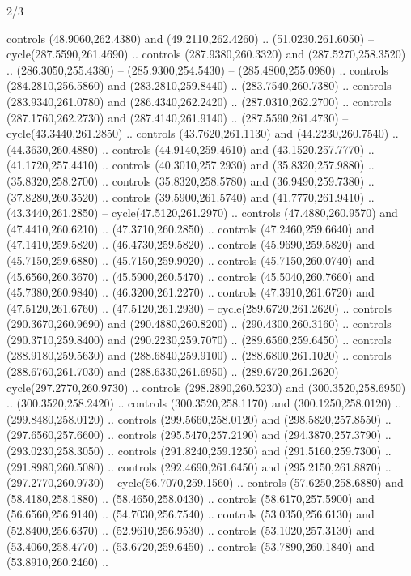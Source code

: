 \begin{flagdescription}{2/3}
\begin{scope}[xshift=0.5\flaglength,yshift=0.5\flagwidth,scale=\stretchfactor]
\begin{scope}[scale=0.001645\flagwidth,yshift=65mm,xshift=-63mm]
\begin{scope}[y=0.80pt, x=0.80pt, yscale=-1,]
\begin{scope}[cm={{1.33333,0.0,0.0,1.33333,(0.0,1e-05)}}]
  controls (48.9060,262.4380) and (49.2110,262.4260) .. (51.0230,261.6050) --
  cycle(287.5590,261.4690) .. controls (287.9380,260.3320) and
  (287.5270,258.3520) .. (286.3050,255.4380) -- (285.9300,254.5430) --
  (285.4800,255.0980) .. controls (284.2810,256.5860) and (283.2810,259.8440) ..
  (283.7540,260.7380) .. controls (283.9340,261.0780) and (286.4340,262.2420) ..
  (287.0310,262.2700) .. controls (287.1760,262.2730) and (287.4140,261.9140) ..
  (287.5590,261.4730) -- cycle(43.3440,261.2850) .. controls (43.7620,261.1130)
  and (44.2230,260.7540) .. (44.3630,260.4880) .. controls (44.9140,259.4610)
  and (43.1520,257.7770) .. (41.1720,257.4410) .. controls (40.3010,257.2930)
  and (35.8320,257.9880) .. (35.8320,258.2700) .. controls (35.8320,258.5780)
  and (36.9490,259.7380) .. (37.8280,260.3520) .. controls (39.5900,261.5740)
  and (41.7770,261.9410) .. (43.3440,261.2850) -- cycle(47.5120,261.2970) ..
  controls (47.4880,260.9570) and (47.4410,260.6210) .. (47.3710,260.2850) ..
  controls (47.2460,259.6640) and (47.1410,259.5820) .. (46.4730,259.5820) ..
  controls (45.9690,259.5820) and (45.7150,259.6880) .. (45.7150,259.9020) ..
  controls (45.7150,260.0740) and (45.6560,260.3670) .. (45.5900,260.5470) ..
  controls (45.5040,260.7660) and (45.7380,260.9840) .. (46.3200,261.2270) ..
  controls (47.3910,261.6720) and (47.5120,261.6760) .. (47.5120,261.2930) --
  cycle(289.6720,261.2620) .. controls (290.3670,260.9690) and
  (290.4880,260.8200) .. (290.4300,260.3160) .. controls (290.3710,259.8400) and
  (290.2230,259.7070) .. (289.6560,259.6450) .. controls (288.9180,259.5630) and
  (288.6840,259.9100) .. (288.6800,261.1020) .. controls (288.6760,261.7030) and
  (288.6330,261.6950) .. (289.6720,261.2620) -- cycle(297.2770,260.9730) ..
  controls (298.2890,260.5230) and (300.3520,258.6950) .. (300.3520,258.2420) ..
  controls (300.3520,258.1170) and (300.1250,258.0120) .. (299.8480,258.0120) ..
  controls (299.5660,258.0120) and (298.5820,257.8550) .. (297.6560,257.6600) ..
  controls (295.5470,257.2190) and (294.3870,257.3790) .. (293.0230,258.3050) ..
  controls (291.8240,259.1250) and (291.5160,259.7300) .. (291.8980,260.5080) ..
  controls (292.4690,261.6450) and (295.2150,261.8870) .. (297.2770,260.9730) --
  cycle(56.7070,259.1560) .. controls (57.6250,258.6880) and (58.4180,258.1880)
  .. (58.4650,258.0430) .. controls (58.6170,257.5900) and (56.6560,256.9140) ..
  (54.7030,256.7540) .. controls (53.0350,256.6130) and (52.8400,256.6370) ..
  (52.9610,256.9530) .. controls (53.1020,257.3130) and (53.4060,258.4770) ..
  (53.6720,259.6450) .. controls (53.7890,260.1840) and (53.8910,260.2460) ..

\end{scope}
\end{scope}
\end{scope}
\end{scope}
\end{flagdescription}
